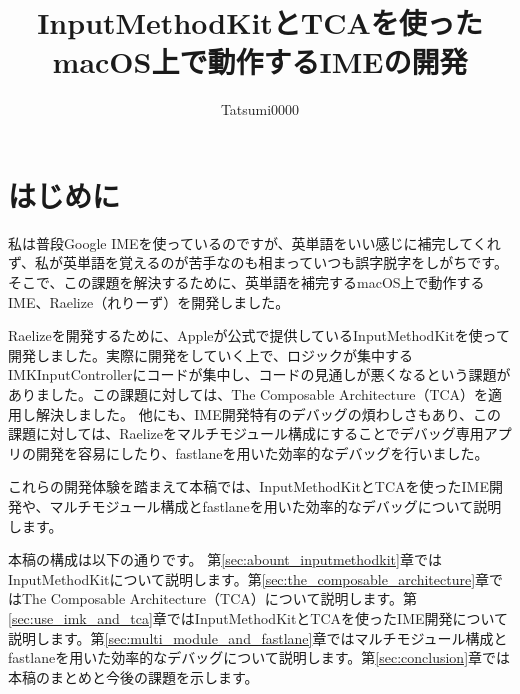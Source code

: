 \documentclass[uplatex,a4j,12pt]{jsarticle}
\begin{document}
\title{\vspace{-10mm}InputMethodKitとTCAを使ったmacOS上で動作するIMEの開発}
\author{Tatsumi0000}
\date{\vspace{-15mm}}
\maketitle


\section{はじめに}\label{sec:intro}
私は普段Google IMEを使っているのですが、英単語をいい感じに補完してくれず、私が英単語を覚えるのが苦手なのも相まっていつも誤字脱字をしがちです。そこで、この課題を解決するために、英単語を補完するmacOS上で動作するIME、Raelize（れりーず）を開発しました。

Raelizeを開発するために、Appleが公式で提供しているInputMethodKit\cite{bib:about_inputmethodkit}を使って開発しました。実際に開発をしていく上で、ロジックが集中するIMKInputControllerにコードが集中し、コードの見通しが悪くなるという課題がありました。この課題に対しては、The Composable Architecture（TCA）\cite{bib:the_composable_architecture}を適用し解決しました。
他にも、IME開発特有のデバッグの煩わしさもあり、この課題に対しては、Raelizeをマルチモジュール構成にすることでデバッグ専用アプリの開発を容易にしたり、fastlane\cite{bib:fastlane}を用いた効率的なデバッグを行いました。

これらの開発体験を踏まえて本稿では、InputMethodKitとTCAを使ったIME開発や、マルチモジュール構成とfastlaneを用いた効率的なデバッグについて説明します。

本稿の構成は以下の通りです。
第\ref{sec:abount_inputmethodkit}章ではInputMethodKitについて説明します。第\ref{sec:the_composable_architecture}章ではThe Composable Architecture（TCA）について説明します。第\ref{sec:use_imk_and_tca}章ではInputMethodKitとTCAを使ったIME開発について説明します。第\ref{sec:multi_module_and_fastlane}章ではマルチモジュール構成とfastlaneを用いた効率的なデバッグについて説明します。第\ref{sec:conclusion}章では本稿のまとめと今後の課題を示します。

\end{document}
